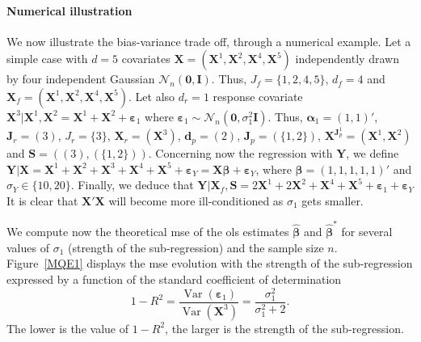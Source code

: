 \documentclass[11pt,a4paper]{article}
\begin{document}

\paragraph{Numerical illustration} We now illustrate the bias-variance trade off, through a numerical example. Let a simple case with $d=5$ covariates $\boldsymbol{X}=(\boldsymbol{X}^1,\boldsymbol{X}^2, \boldsymbol{X}^4, \boldsymbol{X}^5)$ independently drawn by four independent Gaussian $\mathcal{N}_n(\boldsymbol{0},\boldsymbol{I})$. Thus, $J_f=\{1,2,4,5\}$, $d_f=4$ and $\boldsymbol{X}_f=(\boldsymbol{X}^1,\boldsymbol{X}^2,\boldsymbol{X}^4,\boldsymbol{X}^5)$. Let also $d_r=1$ response covariate $\boldsymbol{X}^3|\boldsymbol{X}^1,\boldsymbol{X}^2=\boldsymbol{X}^1+\boldsymbol{X}^2+\boldsymbol{\varepsilon}_1$ where $\boldsymbol{\varepsilon}_1\sim{\mathcal{N}_n(\boldsymbol{0},\sigma_1^2\boldsymbol{I})}$. Thus, $\boldsymbol{\alpha}_1=(1,1)'$, $\boldsymbol{J}_r=(3)$, $J_r=\{3\}$, $\boldsymbol{X}_r=(\boldsymbol{X}^3)$, $\boldsymbol{d}_p=(2)$, $\boldsymbol{J}_p=(\{1,2\})$, $\boldsymbol{X}^{\boldsymbol{J}_p^1}=(\boldsymbol{X}^1,\boldsymbol{X}^2)$ and $\boldsymbol{S}=((3),(\{1,2\}))$. Concerning now the regression with $\boldsymbol{Y}$, we define $\boldsymbol{Y}|\boldsymbol{X}=\boldsymbol{X}^1+\boldsymbol{X}^2+\boldsymbol{X}^3+\boldsymbol{X}^4+\boldsymbol{X}^5+\boldsymbol{\varepsilon}_Y=\boldsymbol{X}\boldsymbol{\beta}+\boldsymbol{\varepsilon}_Y$, where $\boldsymbol{\beta}=(1,1,1,1,1)'$ and $\sigma_Y \in \{10,20\}$. Finally, we deduce that $\boldsymbol{Y}|\boldsymbol{X}_f,\boldsymbol{S}=2\boldsymbol{X}^1+2\boldsymbol{X}^2+\boldsymbol{X}^4+\boldsymbol{X}^5+\boldsymbol{\varepsilon}_1+\boldsymbol{\varepsilon}_Y$
It is clear that $\boldsymbol{X}'\boldsymbol{X}$ will become more ill-conditioned as $\sigma_1$ gets smaller.
	
We compute now the theoretical {\sc mse} of the {\sc ols} estimates $\hat{\boldsymbol{\beta}}$ and $\hat{\boldsymbol{\beta}}^*$ for several values of $\sigma_1$ (strength of the sub-regression) and the sample size $n$. Figure~\ref{MQE1} displays the {\sc mse} evolution with the strength of the sub-regression expressed by a function of the standard coefficient of determination
	\begin{equation}
		1-R^2=\frac{\operatorname{Var}(\boldsymbol{\varepsilon}_1)}{\operatorname{Var}(\boldsymbol{X}^3)}=\frac{\sigma_1^2}{\sigma_1^2+2}.
	\end{equation}
The lower is the value of $1-R^2$, the larger is the strength of the sub-regression.
	
\end{document}
